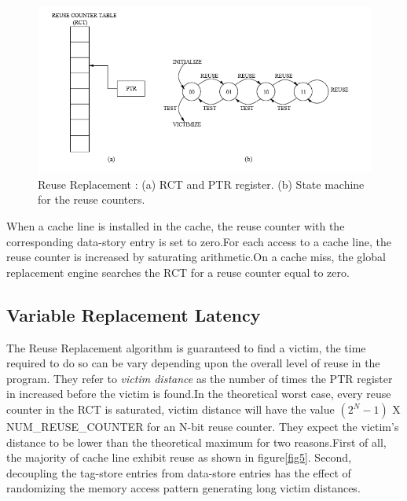 \documentclass{report}
\begin{document}
\begin{figure}[h!]
\includegraphics[width=1\textwidth]{./fig6}
\caption{Reuse Replacement : (a) RCT and PTR register. (b) State machine for the reuse counters.}
\label{fig6}
\end{figure}
When a cache line is installed in the cache, the reuse counter with the corresponding data-story entry is set to zero.For each access to a cache line, the reuse counter is increased by saturating arithmetic.On a cache miss, the global replacement engine searches the RCT for a reuse counter equal to zero.

\subsection{Variable Replacement Latency}

\vspace{1cm}
The Reuse Replacement algorithm is guaranteed to find a victim, the time required to do so can be vary depending upon the overall level of reuse in the program. They refer to \emph{victim distance} as the number of times the PTR register in increased before the victim is found.In the theoretical worst case, every reuse counter in the RCT is saturated, victim distance will have the  value $(2^N-1)$ X NUM\_REUSE\_COUNTER for an N-bit reuse counter. They expect the victim's distance to be lower than the theoretical maximum for two reasons.First of all, the majority of cache line exhibit reuse as shown in figure\ref{fig5}. Second, decoupling the tag-store entries from data-store entries has the effect of randomizing the memory access pattern generating long victim distances.
\end{document}
